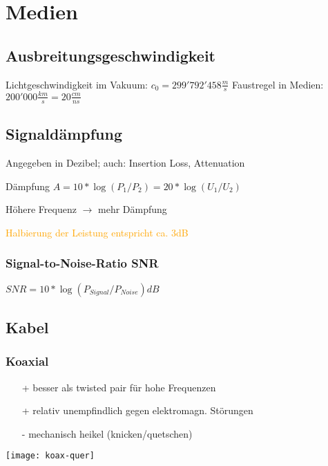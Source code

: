 \section{Medien}
\subsection{Ausbreitungsgeschwindigkeit}

Lichtgeschwindigkeit im Vakuum: $c_0 = 299'792'458 \frac{m}{s}$
Faustregel in Medien: $200'000 \frac{km}{s} = 20 \frac{cm}{ns}$

\subsection{Signaldämpfung}
\small{Angegeben in Dezibel; auch: Insertion Loss, Attenuation}

Dämpfung $A =  10 * \log(P_1 / P_2) = 20 * \log(U_1 / U_2)$

Höhere Frequenz $\rightarrow$ mehr Dämpfung

\textcolor{orange}{Halbierung der Leistung entspricht ca. 3dB}

\subsubsection{Signal-to-Noise-Ratio SNR}

$ SNR = 10 * \log(P_{Signal} / P_{Noise}) dB $

\subsection{Kabel}

\subsubsection{Koaxial}
\begin{minipage}{0.5\linewidth}
    \begin{itemize}
        \item[+] besser als twisted pair für hohe Frequenzen
        \item[+] relativ unempfindlich gegen elektromagn. Störungen
        \item[-] mechanisch heikel (knicken/quetschen)
    \end{itemize}
\end{minipage}
\hfill
\begin{minipage}{0.4\linewidth}
    \texttt{[image: koax-quer]}
\end{minipage}


